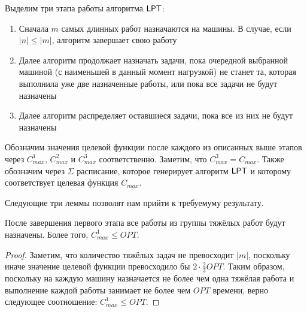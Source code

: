 \noindent
Выделим три этапа работы алгоритма $\sf{LPT}$:
\begin{enumerate}
    \item Сначала $m$ самых длинных работ назначаются на машины. В случае, если $|n| \leq |m|$, алгоритм завершает свою работу
    \item Далее алгоритм продолжает назначать задачи, пока очередной выбранной машиной (с наименьшей в данный момент нагрузкой) не станет та, которая выполнила уже две назначенные работы, или пока все задачи не будут назначены
    \item Далее алгоритм распределяет оставшиеся задачи, пока все из них не будут назначены
\end{enumerate}

\noindent
Обозначим значения целевой функции после каждого из описанных выше этапов через $C_{max}^{1}$, $C_{max}^{2}$ и $C_{max}^{3}$ соответственно. Заметим, что $C_{max}^{3} = C_{max}$. Также обозначим через $\Sigma$ расписание, которое генерирует алгоритм $\sf{LPT}$ и которому соответствует целевая функция $C_{max}$.

Следующие три леммы позволят нам прийти к требуемуму результату.

\begin{lemma}
    После завершения первого этапа все работы из группы тяжёлых работ будут назначены. Более того, $C_{max}^{1} \leq OPT$.
\end{lemma}
\begin{proof}
    Заметим, что количество тяжёлых задач не превосходит $|m|$, поскольку иначе значение целевой функции превосходило бы $2 \cdot \frac{2}{3}OPT$. Таким образом, поскольку на каждую машину назначается не более чем одна тяжёлая работа и выполнение каждой работы занимает не более чем $OPT$ времени, верно следующее соотношение: $C_{max}^{1} \leq OPT$.
\end{proof}

